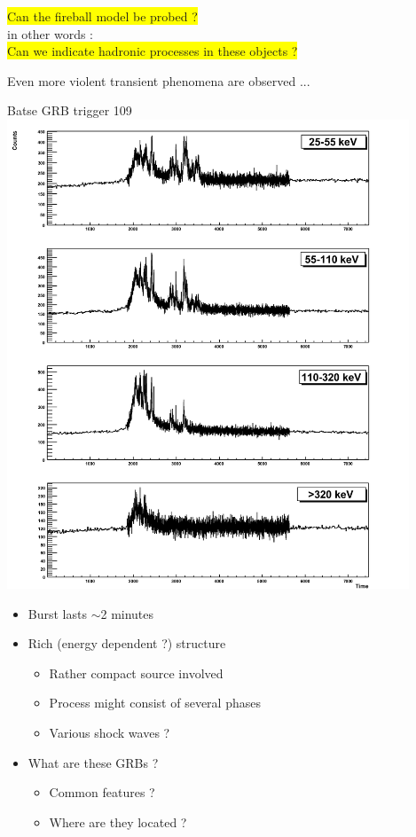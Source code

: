 \begin{center}
\colorbox{yellow}{Can the fireball model be probed ?}\\[5mm]
in other words :\\[5mm]
\colorbox{yellow}{Can we indicate hadronic processes in these objects ?}
\end{center}
%
Even more violent transient phenomena are observed ...
\Tr
\twocolumn
\begin{center}
{\blue Batse GRB trigger 109}\\[5mm]
\includegraphics[keepaspectratio,height=14cm]{batse-109}
\end{center}

\newpage

\vspace*{2cm}
%
\begin{itemize}
\item Burst lasts $\sim$2 minutes
\item Rich (energy dependent ?) structure
\begin{itemize}
\item Rather compact source involved
\item Process might consist of several phases
\item[] Various shock waves ?
\end{itemize}
\item[] What are these GRBs ?
\begin{itemize}
\item Common features ?
\item Where are they located ?
\end{itemize}
\end{itemize}

